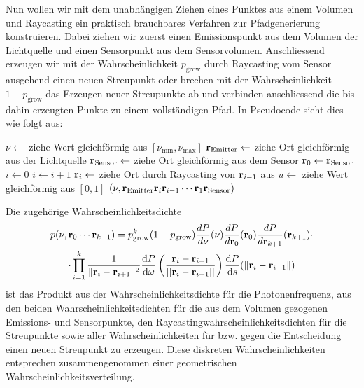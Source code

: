 	Nun wollen wir mit dem unabhängigen Ziehen eines Punktes aus einem Volumen und Raycasting ein praktisch brauchbares Verfahren zur Pfadgenerierung konstruieren. Dabei ziehen wir zuerst einen Emissionspunkt aus dem Volumen der Lichtquelle und einen Sensorpunkt aus dem Sensorvolumen. Anschliessend erzeugen wir mit der Wahrscheinlichkeit $p_\text{grow}$ durch Raycasting vom Sensor ausgehend einen neuen Streupunkt oder brechen mit der Wahrscheinlichkeit $1-p_\text{grow}$ das Erzeugen neuer Streupunkte ab und verbinden anschliessend die bis dahin erzeugten Punkte zu einem vollständigen Pfad. In Pseudocode sieht dies wie folgt aus:
	
	\begin{algorithmic}
		\STATE $\nu \leftarrow$ ziehe Wert gleichförmig aus $[\nu_\text{min},\nu_\text{max}]$
		\STATE $\mathbf{r}_\text{Emitter} \leftarrow$ ziehe Ort gleichförmig aus der Lichtquelle
		\STATE $\mathbf{r}_\text{Sensor} \leftarrow$ ziehe Ort gleichförmig aus dem Sensor
		\STATE $\mathbf{r}_0 \leftarrow \mathbf{r}_\text{Sensor}$
		\STATE $i \leftarrow 0$
		\REPEAT
			\STATE $i \leftarrow i+1$
			\STATE $\mathbf{r}_i \leftarrow$ ziehe Ort durch Raycasting von $\mathbf{r}_{i-1}$ aus
			\STATE $u \leftarrow$ ziehe Wert gleichförmig aus $[0,1]$
	  \RETURN $(\nu,\mathbf{r}_\text{Emitter}\mathbf{r}_i\mathbf{r}_{i-1}\cdots\mathbf{r}_1\mathbf{r}_\text{Sensor})$
	\end{algorithmic}
	
	Die zugehörige Wahrscheinlichkeitsdichte
	\begin{multline*}
		p(\nu,\mathbf{r}_0\cdots\mathbf{r}_{k+1})=p_\text{grow}^k(1-p_\text{grow})\frac{dP}{d\nu}(\nu)\frac{dP}{d\mathbf{r}_0}(\mathbf{r}_0)\frac{dP}{d\mathbf{r}_{k+1}}(\mathbf{r}_{k+1}) \cdot \\
	\cdot \prod_{i=1}^k \frac{1}{\|\mathbf{r}_i - \mathbf{r}_{i+1}\|^2} \frac{\text{d}P}{\text{d}\omega}\left(\frac{\mathbf{r}_i - \mathbf{r}_{i+1}}{||\mathbf{r}_i - \mathbf{r}_{i+1}||}\right) \frac{\text{d}P}{\text{d}s}(\|\mathbf{r}_i-\mathbf{r}_{i+1}\|)
	\end{multline*}
	ist das Produkt aus der Wahrscheinlichkeitsdichte für die Photonenfrequenz, aus den beiden Wahrscheinlichkeitsdichten für die aus dem Volumen gezogenen Emis\-sions- und Sen\-sor\-punkte, den Ray\-casting\-wahr\-schein\-lich\-keits\-dich\-ten für die Streupunkte sowie aller Wahrscheinlichkeiten für bzw. gegen die Entscheidung einen neuen Streupunkt zu erzeugen. Diese diskreten Wahrscheinlichkeiten entsprechen zusammengenommen einer geometrischen Wahrscheinlichkeitsverteilung.
	
